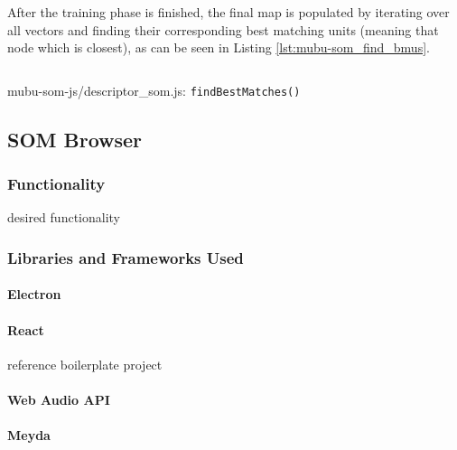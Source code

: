 \smallskip

After the training phase is finished, the final map is populated by iterating
over all vectors and finding their corresponding best matching units (meaning
that node which is closest), as can be seen in Listing
\ref{lst:mubu-som_find_bmus}.

\begin{listing}[!htb]
  \begin{mdframed}
    \inputminted[breaklines, numbers=left, firstline=316, lastline=335,
    fontsize=\footnotesize]{js}{../dev/mubu-som-js/descriptor_som.js}
  \end{mdframed}
  \caption{mubu-som-js/descriptor\_som.js: \texttt{findBestMatches()}}
  \label{lst:mubu-som_find_bmus}
\end{listing}

\subsection{SOM Browser}
\label{subsec:implementation_som-browser}

\subsubsection{Functionality}
\label{subsubsec:som-browser_functionality}
desired functionality

\subsubsection{Libraries and Frameworks Used}
\label{subsubsec:som-browser_libraries}

\paragraph{Electron}
\label{para:electron}

\paragraph{React}
\label{para:react}
reference boilerplate project

\paragraph{Web Audio API}
\label{para:web_audio_api}

\paragraph{Meyda}
\label{para:meyda}

